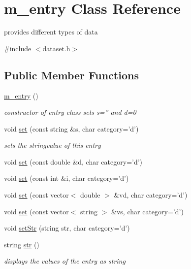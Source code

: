 \hypertarget{classm__entry}{
\section{m\_\-entry Class Reference}
\label{classm__entry}
}


provides different types of data  




{\ttfamily \#include $<$dataset.h$>$}

\subsection*{Public Member Functions}
\begin{DoxyCompactItemize}
\item 
\hyperlink{classm__entry_aad6b7f6dc2b1dd165b156bac45c61f50}{m\_\-entry} ()
\begin{DoxyCompactList}\small\item\em constructor of entry class sets s='' and d=0 \item\end{DoxyCompactList}\item 
void \hyperlink{classm__entry_a725f4e337865c5a9fb4b4fa538c6bf90}{set} (const string \&s, char category='d')
\begin{DoxyCompactList}\small\item\em sets the stringvalue of this entry \item\end{DoxyCompactList}\item 
void \hyperlink{classm__entry_aaf31e825af3be2a5f8b0c1abc6757736}{set} (const double \&d, char category='d')
\item 
void \hyperlink{classm__entry_a50447dab5f76fc1ddb40609a3a2a0c73}{set} (const int \&i, char category='d')
\item 
void \hyperlink{classm__entry_a2545fc16f8cf91acc39290812df4d0aa}{set} (const vector$<$ double $>$ \&vd, char category='d')
\item 
void \hyperlink{classm__entry_a35cde3937959533225344c01b31f77cc}{set} (const vector$<$ string $>$ \&vs, char category='d')
\item 
void \hyperlink{classm__entry_ab749a4ab6b82dbc81f28e95a377d9136}{setStr} (string str, char category='d')
\item 
string \hyperlink{classm__entry_aa00e8fb80d7f80d02756570613f3362f}{str} ()
\begin{DoxyCompactList}\small\item\em displays the values of the entry as string \item\end{DoxyCompactList}\end{DoxyCompactItemize}
